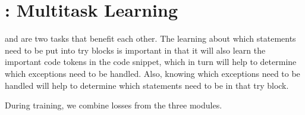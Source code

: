 \section{{\xtype}: Multitask Learning}
\label{sec:multitasking}

{\xstate} and {\xtype} are two tasks that benefit each other. The learning about which statements need to be put into try blocks is important in that it will also learn 
the important code tokens in the code snippet, which in turn will help to determine which exceptions need
to be handled. Also, knowing which exceptions need to be handled will help to determine which statements need to be in that try block.

During training, we combine losses from the three modules.  


 